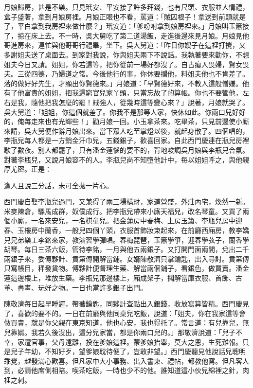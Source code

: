 月娘歸房，甚是不樂。只見玳安、平安接了許多拜錢，也有尺頭、衣服並人情禮，盒子盛著，拿到月娘房裡。月娘正眼也不看，罵道：「賊囚根子！拿送到前頭就是了，平白拿到我房裡來做什麼？」玳安道：「爹吩咐拿到娘房裡來。」月娘叫玉簫接了，掠在床上去。不一時，吳大舅吃了第二道湯飯，走進後邊來見月娘。月娘見他哥進房來，連忙與他哥哥行禮畢，坐下。吳大舅道：「昨日你嫂子在這裡打攪，又多謝姐夫送了桌面去。到家對我說，你與姐夫兩下不說話。我執著要來勸你，不想姐夫今日又請。姐姐，你若這等，把你從前一場好都沒了。自古癡人畏婦，賢女畏夫。三從四德，乃婦道之常。今後他行的事，你休要攔他，料姐夫他也不肯差了。落的做好好先生，才顯出你賢德來。」月娘道：「早賢德好來，不教人這般憎嫌。他有了他富貴的姐姐，把我這窮官兒家丫頭，只當忘故了的算帳。你也不要管他，左右是我，隨他把我怎麼的罷！賊強人，從幾時這等變心來？」說著，月娘就哭了。吳大舅道：「姐姐，你這個就差了。你我不是那等人家，快休如此。你兩口兒好好的，俺每走來也有光輝些！」勸月娘一回。小玉拿茶來。吃畢茶，只見前邊使小廝來請，吳大舅便作辭月娘出來。當下眾人吃至掌燈以後，就起身散了。四個唱的，李瓶兒每人都是一方銷金汗巾兒，五錢銀子，歡喜回家。自此西門慶連在瓶兒房裡歇了數夜。別人都罷了，只有潘金蓮惱的要不的，背地唆調吳月娘與李瓶兒合氣。對著李瓶兒，又說月娘容不的人。李瓶兒尚不知墮他計中，每以姐姐呼之，與他親厚尤密。正是：

逢人且說三分話，未可全拋一片心。

西門慶自娶李瓶兒過門，又兼得了兩三場橫財，家道營盛，外莊內宅，煥然一新。米麥陳倉，騾馬成群，奴僕成行。把李瓶兒帶來小廝天福兒，改名琴童。又買了兩個小廝，一名來安兒，一名棋童兒。把金蓮房中春梅、上房玉簫、李瓶兒房中迎春、玉樓房中蘭香，一般兒四個丫頭，衣服首飾妝束起來，在前廳西廂房，教李嬌兒兄弟樂工李銘來家，教演習學彈唱。春梅琵琶，玉簫學箏，迎春學弦子，蘭香學胡琴。每日三茶六飯，管待李銘，一月與他五兩銀子。又打開門面兩間，兌出二千兩銀子來，委傅夥計、賁第傳開解當鋪。女婿陳敬濟只掌鑰匙，出入尋討。賁第傳只寫帳目，秤發貨物。傅夥計便督理生藥、解當兩個鋪子，看銀色，做買賣。潘金蓮這邊樓上，堆放生藥。李瓶兒那邊樓上，廂成架子，擱解當庫衣服、首飾、古董、書畫、玩好之物。一日也當許多銀子出門。

陳敬濟每日起早睡遲，帶著鑰匙，同夥計查點出入銀錢，收放寫算皆精。西門慶見了，喜歡的要不的。一日在前廳與他同桌兒吃飯，說道：「姐夫，你在我家這等會做買賣，就是你父親在東京知道，他也心安，我也得托了。常言道：有兒靠兒，無兒靠婿。我若久後沒出，這分兒家當，都是你兩口兒的。」那敬濟說道：「兒子不幸，家遭官事，父母遠離，投在爹娘這裡。蒙爹娘抬舉，莫大之恩，生死難報。只是兒子年幼，不知好歹，望爹娘耽待便了，豈敢非望。」西門慶聽見他說話兒聰明乖覺，越發滿心歡喜。但凡家中大小事務、出入書柬、禮帖，都教他寫。但凡客人到，必請他席側相陪。喫茶吃飯，一時也少不的他。誰知道這小伙兒綿裡之針，肉裡之刺。

